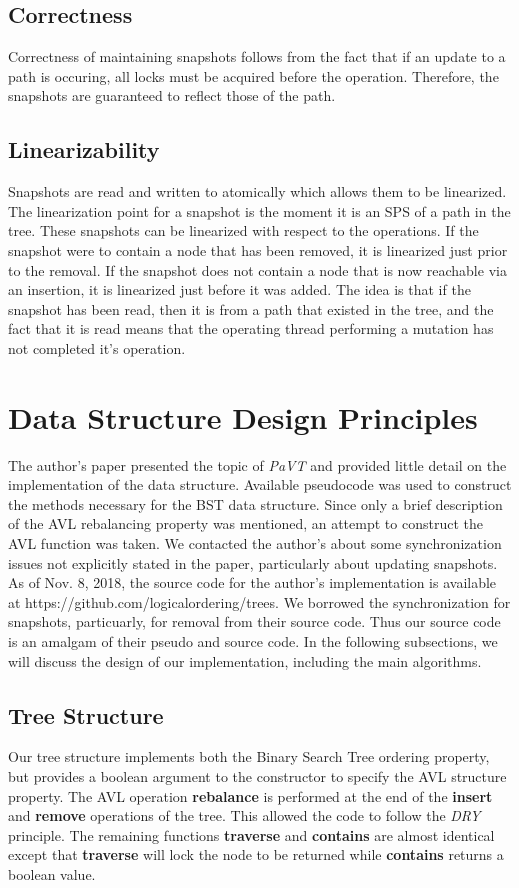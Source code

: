 \documentclass[conference]{IEEEtran}
\theoremstyle{definition}
\theoremstyle{theorem}
\begin{document}
\subsection{Correctness}
Correctness of maintaining snapshots follows from the fact that if an update to a path is occuring, all locks must be acquired before the operation. Therefore, the snapshots are guaranteed to reflect those of the path. 
\subsection{Linearizability}
Snapshots are read and written to atomically which allows them to be linearized. The linearization point for a snapshot is the moment it is an SPS of a path in the tree. These snapshots can be linearized with respect to the operations. If the snapshot were to contain a node that has been removed, it is linearized just prior to the removal. If the snapshot does not contain a node that is now reachable via an insertion, it is linearized just before it was added. The idea is that if the snapshot has been read, then it is from a path that existed in the tree, and the fact that it is read means that the operating thread performing a mutation has not completed it's operation. 
\section{Data Structure Design Principles}

The author's paper presented the topic of \textit{PaVT} and provided little detail on the implementation of the data structure. Available pseudocode was used to construct the methods necessary for the BST data structure. Since only a brief description of the AVL rebalancing property was mentioned, an attempt to construct the AVL function was taken. We contacted the author's about some synchronization issues not explicitly stated in the paper, particularly about updating snapshots. As of Nov. 8, 2018, the source code for the author's implementation is available at {https://github.com/logicalordering/trees}. We borrowed the synchronization for snapshots, particuarly, for removal from their source code. Thus our source code is an amalgam of their pseudo and source code. In the following subsections, we will discuss the design of our implementation, including the main algorithms.

\subsection{Tree Structure}
Our tree structure implements both the Binary Search Tree ordering property, but provides a boolean argument to the constructor to specify the AVL structure property. The AVL operation \textbf{rebalance} is performed at the end of the \textbf{insert} and \textbf{remove} operations of the tree. This allowed the code to follow the \textit{DRY} principle. The remaining functions \textbf{traverse} and \textbf{contains} are almost identical except that \textbf{traverse} will lock the node to be returned while \textbf{contains} returns a boolean value.
\end{document}
